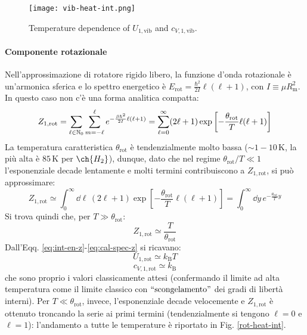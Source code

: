 \begin{figure}
	\centering
	\texttt{[image: vib-heat-int.png]}
	\caption{Temperature dependence of $ U_{1,\text{vib}} $ and $ c_{V,1,\text{vib}} $.}
	\label{vib-heat-int}
\end{figure}

\paragraph{Componente rotazionale}

Nell'approssimazione di rotatore rigido libero, la funzione d'onda rotazionale è un'armonica sferica e lo spettro energetico è $ E_\text{rot} = \frac{\hbar^2}{2I} \ell (\ell + 1) $, con $ I \equiv \mu R_\text{m}^2 $. In questo caso non c'è una forma analitica compatta:
\begin{equation*}
	Z_{1,\text{rot}} = \sum_{\ell \in \mathbb{N}_0} \sum_{m = -\ell}^{\ell} e^{- \frac{\beta \hbar^2}{2I} \ell (\ell + 1)} = \sum_{\ell = 0}^\infty (2\ell + 1) \exp \left[ -\frac{\theta_\text{rot}}{T} \ell (\ell + 1) \right]
\end{equation*}
La temperatura caratteristica $ \theta_\text{rot} $ è tendenzialmente molto bassa ($ \sim 1-10 \,\text{K} $, la più alta è $ 85 \,\text{K} $ per $ \ch{H_2} $), dunque, dato che nel regime $ \theta_\text{rot} / T \ll 1 $ l'esponenziale decade lentamente e molti termini contribuiscono a $ Z_{1,\text{rot}} $, si può approssimare:
\begin{equation*}
	Z_{1,\text{rot}} \simeq \int_0^\infty \dd\ell\, (2\ell + 1) \exp \left[ - \frac{\theta_\text{rot}}{T} \ell (\ell + 1) \right] = \int_0^\infty \dd y\, e^{- \frac{\theta_\text{rot}}{T} y}
\end{equation*}
Si trova quindi che, per $ T \gg \theta_\text{rot} $:
\begin{equation}
	Z_{1,\text{rot}} \simeq \frac{T}{\theta_\text{rot}}
\end{equation}
Dall'Eqq. \ref{eq:int-en-z}-\ref{eq:cal-spec-z} si ricavano:
\begin{equation}
	U_{1,\text{rot}} \simeq k_\text{B} T
\end{equation}
\begin{equation}
	c_{V,1,\text{rot}} \simeq k_\text{B}
\end{equation}
che sono proprio i valori classicamente attesi (confermando il limite ad alta temperatura come il limite classico con $ ``\text{scongelamento}" $ dei gradi di libertà interni). Per $ T \ll \theta_\text{rot} $, invece, l'esponenziale decade velocemente e $ Z_{1,\text{rot}} $ è ottenuto troncando la serie ai primi termini (tendenzialmente si tengono $ \ell = 0 $ e $ \ell = 1 $): l'andamento a tutte le temperature è riportato in Fig. \ref{rot-heat-int}. \\
